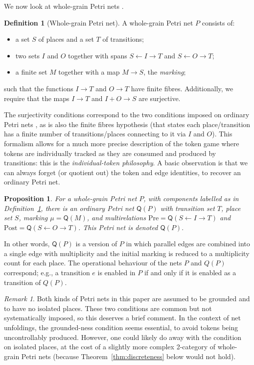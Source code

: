 \documentclass[11pt,a4paper]{article}
\theoremstyle{plain}
\newtheorem{proposition}[theorem]{Proposition}
\theoremstyle{definition}
\newtheorem{definition}[theorem]{Definition}
\theoremstyle{remark}
\newtheorem{remark}[theorem]{Remark}
\newcommand{\Q}{\mathsf{Q}}
\newcommand{\Pre}{\mathrm{Pre}}
\newcommand{\Post}{\mathrm{Post}}
\begin{document}
We now look at whole-grain Petri nets \cite{WGPN}.
\begin{definition}[Whole-grain Petri net]
  \label{def:whole-grain}
  A whole-grain Petri net $P$ consists of:
  \begin{itemize}
  \item a set $S$ of places and a set $T$ of transitions;
  \item two sets $I$ and $O$ together with spans $S \leftarrow I \rightarrow T$
  and $S \leftarrow O \rightarrow T$;
    \item a finite set $M$ together with a map $M \to S$, the \emph{marking};
  \end{itemize}
such that the functions $I \to T$ and $O \to T$ have finite fibres. Additionally, we require that the maps $I \rightarrow T$ and $I + O \rightarrow S$ are
surjective.
 
\end{definition}
The surjectivity conditions correspond to the two conditions imposed
on ordinary Petri nets \cite{ES2}, as is also the finite fibres hypothesis (that states each place/transition has a finite number of transitions/places connecting to it via $I$ and $O$). This formalism allows for a much more precise description of
the token game where tokens are individually tracked as they are consumed and produced by transitions: this is the \emph{individual-token philosophy}.
A basic observation is that we can always forget (or quotient out) the
token and edge identities, to recover an ordinary Petri net.

\begin{proposition}
  \label{prop:Qonobjects}
  For a whole-grain Petri net $P$, with components labelled as in
Definition~\ref{def:whole-grain}, there is an ordinary Petri net $\Q(P)$ with transition set $T$, place set $S$, marking $\mu = \Q(M)$, and multirelations
$\Pre = \Q(S \leftarrow I \rightarrow T)$ and $\Post = \Q(S \leftarrow O \rightarrow T)$. This Petri net is denoted $\Q(P).$
\end{proposition}

In other words, $\Q(P)$ is a version of $P$ in which parallel edges are combined
into a single edge with multiplicity and the initial marking is reduced to a
multiplicity count for each place. The operational behaviour of the nets $P$ and $Q(P)$ correspond; e.g., a transition $e$ is enabled in $P$ if and only if it is enabled as a transition of $Q(P)$. 

\begin{remark}
Both kinds of Petri nets in this paper are assumed to be grounded and to have no isolated places. These two conditions are common but not systematically imposed, so this deserves a brief comment. In the context of net unfoldings, the grounded-ness condition seems essential, to avoid tokens being uncontrollably produced. However, one could likely do away with the condition on isolated places, at the cost of a slightly more complex 2-category of whole-grain Petri nets (because Theorem~\ref{thm:discreteness} below would not hold). 
\end{remark}
\end{document}
